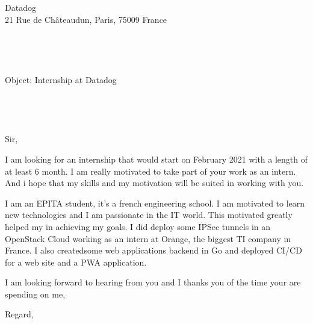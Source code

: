 \documentclass[11pt,a4paper]{letter} %
\def\opening#1{\thispagestyle{empty}
    {\centering\fromaddress \vspace{0.6in} \\ %
    \hspace*{\longindentation}\hspace*{\fill}\par} %
    {\raggedright \toname \\ \toaddress \par} %
    \vspace{0.4in} %
    \noindent #1 %
    }
\begin{document}

    \begin{letter}
        {Datadog \\
        21 Rue de Châteaudun, Paris, 75009 France
        }


        \opening{Object: Internship at Datadog\\
        \\
        \\
        \\
        \\
        Sir,}

        \vspace{0.4in}


        I am looking for an internship that would start on February 2021 with a length of at least 6 month.
        I am really motivated to take part of your work as an intern.
        And i hope that my skills and my motivation will be suited in working with you.

        I am an EPITA student, it's a french engineering school.
        I am motivated to learn new technologies and I am passionate in the IT world. This motivated greatly helped my in achieving my goals.
        I did deploy some IPSec tunnels in an OpenStack Cloud working as an intern at Orange, the biggest TI company in France.
        I also createdsome web applications backend in Go and deployed CI/CD for a web site and a PWA application.

        I am looking forward to hearing from you and I thanks you of the time your are spending on me,

        Regard,

        \closing{}


    \end{letter}
    
\end{document}
